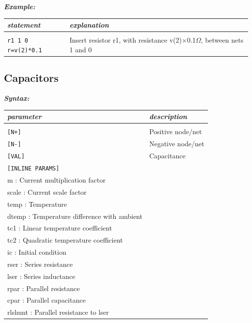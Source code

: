 {\textbf{\textit{Example:}}

\begin{longtable}{l l}
\textit{statement} & \textit{explanation} \\ \hline \\ %
		\texttt{r1 1 0 r={v(2)*0.1}} 
			& {\small Insert resistor r1, with resistance v(2)$\times$0.1$\Omega$, between nets 1 and 0} 
\end{longtable}
}


\newpage
\subsection{Capacitors}
\label{subsec_sceadm_capacitors}

\textbf{\textit{Syntax:}}


\begin{longtable}{l l}
\textit{parameter} & \textit{description} \\ \hline \\ \vspace{-0.8\parskip}
\texttt{[N+]} & Positive node/net \\
\texttt{[N-]} & Negative node/net \\
\texttt{[VAL]} & Capacitance \\
\texttt{[INLINE PARAMS]} & \begin{tabular}{lp{5.5cm}p{5cm}}\textit{Inline parameters :}\\ 
																					{\small m : Current multiplication factor} \\ 
																					{\small scale : Current scale factor} \\
																					{\small temp :  Temperature} \\
																					{\small dtemp : Temperature difference with ambient} \\
																					{\small tc1 : Linear temperature coefficient} \\
																					{\small tc2 : Quadratic temperature coefficient} \\
																					{\small ic : Initial condition} \\
																					{\small rser : Series resistance} \\
																					{\small lser : Series inductance} \\ 
																					{\small rpar : Parallel resistance} \\
																					{\small cpar : Parallel capacitance} \\
																					{\small rlshunt : Parallel resistance to lser} 
																					\end{tabular} 
\end{longtable}

